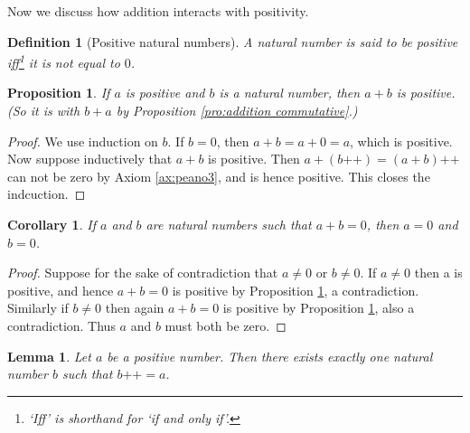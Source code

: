 \documentclass[a4paper]{book}
\newtheorem*{proof}{\textit{Proof.}}
\newtheorem{definition}{Definition}[section]
\newtheorem{corollary}{Corollary}[section]
\newtheorem{lemma}{Lemma}[section]
\newtheorem{proposition}{Proposition}[section]
\begin{document}
			Now we discuss how addition interacts with positivity.
			\begin{definition}[Positive natural numbers]
				A natural number is said to be positive iff\footnote{`Iff' is shorthand for `if and only if'.} it is not equal to $0$.
			\end{definition}
			\begin{proposition}
				\label{pro:a+b>0}
				If $a$ is positive and $b$ is a natural number, then $a+b$ is positive. (So it is with $b+a$ by Proposition \ref{pro:addition commutative}.)
			\end{proposition}
			\begin{proof}
				We use induction on $b$. If $b=0$, then $a+b=a+0=a$, which is positive. Now suppose inductively that $a+b$ is positive. Then $a+(b\texttt{++})=(a+b)\texttt{++}$ can not be zero by Axiom \ref{ax:peano3}, and is hence positive. This closes the indcuction.
			\end{proof}
			\begin{corollary}
				\label{coro:a+b=0}
				If $a$ and $b$ are natural numbers such that $a+b=0$, then $a=0$ and $b=0$.
			\end{corollary}
			\begin{proof}
				Suppose for the sake of contradiction that $a \neq 0$ or $b \neq 0$. If $a \neq 0$ then a is positive, and hence $a+b=0$ is positive by Proposition \ref{pro:a+b>0}, a contradiction. Similarly if $b \neq 0$ then again $a+b=0$ is positive by Proposition \ref{pro:a+b>0}, also a contradiction. Thus $a$ and $b$ must both be zero. 
			\end{proof}
			\begin{lemma}
				\label{lem:b++=a}
				Let $a$ be a positive number. Then there exists exactly one natural number $b$ such that $b\texttt{++}=a$.
			\end{lemma}
\end{document}
